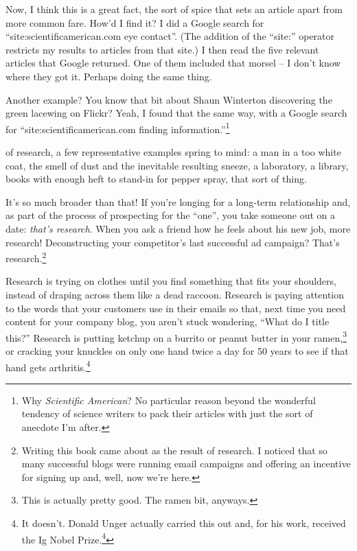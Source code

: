 Now, I think this is a great fact, the sort of spice that sets an article apart from more common fare. How'd I find it? I did a Google search for ``site:scientificamerican.com eye contact''. (The addition of the ``site:'' operator restricts my results to articles from that site.) I then read the five relevant articles that Google returned. One of them included that morsel -- I don't know where they got it. Perhaps doing the same thing.

Another example? You know that bit about Shaun Winterton discovering the green
lacewing on Flickr? Yeah, I found that the same way, with a Google search for
``site:scientificamerican.com finding information.''\footnote{Why
  \textit{Scientific American}? No particular reason beyond the wonderful
  tendency of science writers to pack their articles with just the sort of
  anecdote I'm after.}

 of research, a few representative examples spring
to mind: a man in a too white coat, the smell of dust and the inevitable resulting
sneeze, a laboratory, a library, books with enough heft to stand-in for pepper spray, that sort
of thing.

It's so much broader than that! If you're longing for a long-term relationship
and, as part of the process of prospecting for the ``one'', you take someone out on a date: \textit{that's
  research}. When you ask a friend how he feels about his new job, more
research! Deconstructing your competitor's last successful ad campaign? That's
research.\footnote{Writing this book came about as the result of research. I
  noticed that so many successful blogs were running email campaigns and
  offering an incentive for signing up and, well, now we're here.}

Research is trying on clothes until you find something that fits your shoulders,
instead of draping across them like a dead raccoon. Research is paying attention
to the words that your customers use in their emails so that, next time you need
content for your company blog, you aren't stuck wondering, ``What do I title
this?'' Research is putting ketchup on a burrito or peanut butter in your
ramen,\footnote{This is actually pretty good. The ramen bit, anyways.} or cracking your knuckles on only one
hand twice a day for 50 years to see if that hand gets arthritis.\footnote{It
  doesn't. Donald Unger actually carried this out and, for his work, received the
  Ig Nobel Prize.\footnote{It took me way too long to realize that Ig Nobel is a play on the word ignoble.}}

